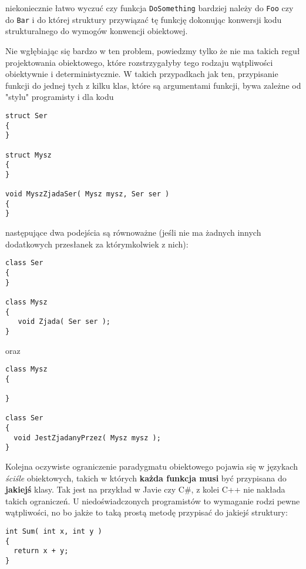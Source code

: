 niekoniecznie łatwo wyczuć czy funkcja {\tt DoSomething} bardziej należy do {\tt Foo} czy do {\tt Bar} i do której struktury
przywiązać tę funkcję dokonując konwersji kodu strukturalnego do wymogów konwencji obiektowej.

Nie wgłębiając się bardzo w ten problem, powiedzmy tylko że nie ma takich reguł projektowania obiektowego, które rozstrzygałyby
tego rodzaju wątpliwości obiektywnie i deterministycznie. W takich przypadkach jak ten, przypisanie funkcji do jednej tych 
z kilku klas, które są argumentami funkcji, bywa zależne od "stylu" programisty i dla kodu

\begin{scriptsize}
\begin{verbatim}
struct Ser
{
}

struct Mysz
{
}

void MyszZjadaSer( Mysz mysz, Ser ser )
{
}
\end{verbatim}
\end{scriptsize}

następujące dwa podejścia są równoważne
(jeśli nie ma żadnych innych dodatkowych przesłanek za którymkolwiek z nich):

\begin{scriptsize}
\begin{verbatim}
class Ser
{
}

class Mysz
{
   void Zjada( Ser ser );  
}
\end{verbatim}
\end{scriptsize}

oraz

\begin{scriptsize}
\begin{verbatim}
class Mysz
{
  
}

class Ser
{
  void JestZjadanyPrzez( Mysz mysz );
}
\end{verbatim}
\end{scriptsize}

Kolejna oczywiste ograniczenie paradygmatu obiektowego pojawia się w językach {\em ściśle} obiektowych, 
takich w których {\bf każda funkcja musi} być przypisana do {\bf jakiejś} klasy. Tak jest na przykład w Javie czy C\#,
z kolei C++ nie nakłada takich ograniczeń. U niedoświadczonych programistów to wymaganie rodzi pewne wątpliwości,
no bo jakże to taką prostą metodę przypisać do jakiejś struktury:

\begin{scriptsize}
\begin{verbatim}
int Sum( int x, int y )
{
  return x + y;
}
\end{verbatim}
\end{scriptsize}


